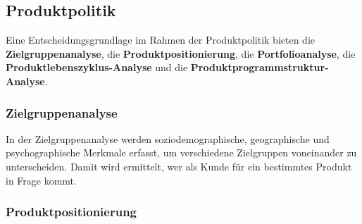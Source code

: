 \subsection{Produktpolitik}

Eine Entscheidungsgrundlage im Rahmen der Produktpolitik bieten die {\bf Zielgruppenanalyse}, die {\bf Produktpositionierung}, die {\bf Portfolioanalyse}, die {\bf Produktlebenszyklus-Analyse} und die {\bf Produktprogrammstruktur-Analyse}.

\subsubsection{Zielgruppenanalyse}

In der Zielgruppenanalyse werden soziodemographische, geographische und psychographische Merkmale erfasst, um verschiedene Zielgruppen voneinander zu unterscheiden. Damit wird ermittelt, wer als Kunde für ein bestimmtes Produkt in Frage kommt.

\subsubsection{Produktpositionierung}

